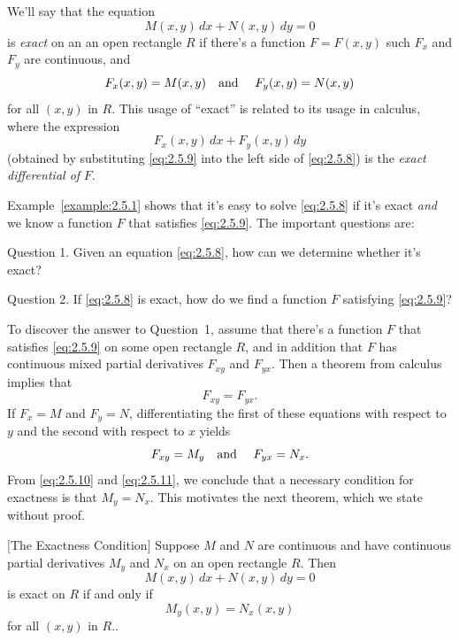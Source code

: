 \documentclass{ximera}
\begin{document}
We'll say that  the equation
\begin{equation} \label{eq:2.5.8}
M(x,y)\,dx+N(x,y)\,dy=0
\end{equation}
 is  {\color{blue}\it exact} on an an open rectangle  $R$ if there's
a function $F=F(x,y)$ such  $F_x$
and $F_y$  are continuous, and
\begin{equation} \label{eq:2.5.9}
F_x(x,y)=M(x,y) \mbox{\quad and \quad} F_y(x,y)=N(x,y)
\end{equation}
for  all  $(x,y)$ in $R$.
This usage of ``exact'' is related  to its usage in calculus,
where the expression
$$
F_x(x,y)\,dx+F_y(x,y)\,dy
$$
(obtained by substituting \eqref{eq:2.5.9} into the left side of
\eqref{eq:2.5.8}) is the  {\color{blue}\it exact differential of\/} $F$.

Example~\ref{example:2.5.1} shows that it's easy to solve
\eqref{eq:2.5.8}
if it's exact {\color{blue}\it and}  we know a function $F$ that satisfies
\eqref{eq:2.5.9}. The important questions are:

 {\sc Question 1.}  Given an equation
\eqref{eq:2.5.8}, how can we determine whether it's  exact?

 {\sc Question 2.} If \eqref{eq:2.5.8} is exact, how do we find
a function $F$ satisfying \eqref{eq:2.5.9}?

To discover the answer to Question~1,
 assume that  there's a function $F$  that satisfies \eqref{eq:2.5.9} on
some open rectangle $R$, and in addition that $F$ has continuous mixed
partial derivatives $F_{xy}$ and $F_{yx}$.  Then a theorem from calculus
implies that
\begin{equation} \label{eq:2.5.10}
F_{xy}=F_{yx}.
\end{equation}
If $F_x=M$ and $F_y=N$,
differentiating the first of these equations with respect to
$y$ and the second with respect to $x$ yields
\begin{equation} \label{eq:2.5.11}
F_{xy}=M_y\mbox{\quad and \quad}  F_{yx}=N_x.
\end{equation}
From  \eqref{eq:2.5.10}  and \eqref{eq:2.5.11}, we conclude that
 a necessary condition for exactness is that $M_y=N_x$.
This motivates the next theorem, which we state without proof.

\begin{theorem}\color{blue} $[$The Exactness
Condition$]$\label{thmtype:2.5.2}
 \space  Suppose  $M$ and
$N$ are continuous and have continuous partial derivatives
$M_y$ and $N_x$ on an open rectangle $R.$ Then
$$
M(x,y)\,dx+N(x,y)\,dy=0
$$
is exact on $R$ if and only if
\begin{equation} \label{eq:2.5.12}
M_y(x,y)=N_x(x,y)
\end{equation}
for all $(x,y)$ in  $R.$.
\end{theorem}
\end{document}

